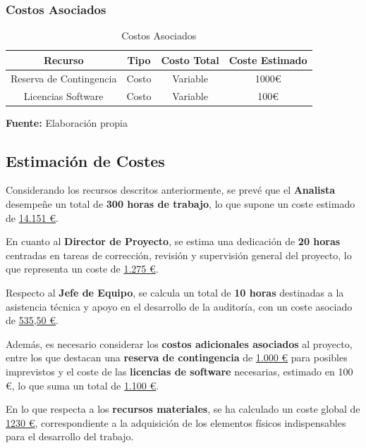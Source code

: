 \documentclass[a4paper, 11pt]{article}
\begin{document}
\subsubsection{Costos Asociados}

\begin{table}[H]
\caption{Costos Asociados}
\centering
\renewcommand{\arraystretch}{1.5}
\begin{tabular}{|c|c|c|c|}
\hline
\textbf{Recurso} & \textbf{Tipo} & \textbf{Costo Total} & \textbf{Coste Estimado}  \\ \hline
Reserva de Contingencia & Costo & Variable & 1000€  \\ \hline
Licencias Software & Costo & Variable &  100€ \\ \hline
\end{tabular}
\begin{flushleft}\centering
    \footnotesize \textbf{Fuente:} Elaboración propia
\end{flushleft}   
\label{tab:costos_asociados}
\end{table}

\subsection{Estimación de Costes}

Considerando los recursos descritos anteriormente, se prevé que el \textbf{Analista} desempeñe un total de \textbf{300 horas de trabajo}, lo que supone un coste estimado de \underline{14.151 €}.  

En cuanto al \textbf{Director de Proyecto}, se estima una dedicación de \textbf{20 horas} centradas en tareas de corrección, revisión y supervisión general del proyecto, lo que representa un coste de \underline{1.275 €}.  

Respecto al \textbf{Jefe de Equipo}, se calcula un total de \textbf{10 horas} destinadas a la asistencia técnica y apoyo en el desarrollo de la auditoría, con un coste asociado de \underline{535,50 €}.  

Además, es necesario considerar los \textbf{costos adicionales asociados} al proyecto, entre los que destacan una \textbf{reserva de contingencia} de \underline{1.000 €} para posibles imprevistos y el coste de las \textbf{licencias de software} necesarias, estimado en 100 €, lo que suma un total de \underline{1.100 €}.  

En lo que respecta a los \textbf{recursos materiales}, se ha calculado un coste global de \underline{1230 €}, correspondiente a la adquisición de los elementos físicos indispensables para el desarrollo del trabajo.  
\end{document}

